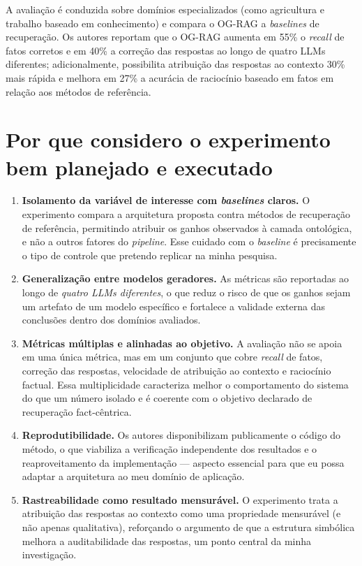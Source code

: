 \documentclass{article}
\begin{document}
	A avaliação é conduzida sobre domínios especializados (como agricultura e
	trabalho baseado em conhecimento) e compara o OG-RAG a \emph{baselines} de
	recuperação. Os autores reportam que o OG-RAG aumenta em 55\% o \textit{recall}
	de fatos corretos e em 40\% a correção das respostas ao longo de quatro LLMs
	diferentes; adicionalmente, possibilita atribuição das respostas ao contexto 30\%
	mais rápida e melhora em 27\% a acurácia de raciocínio baseado em fatos em relação
	aos métodos de referência.
	
	\section{Por que considero o experimento bem planejado e executado}
	
	\begin{enumerate}
		\item \textbf{Isolamento da variável de interesse com \textit{baselines} claros.}
		O experimento compara a arquitetura proposta contra métodos de recuperação de
		referência, permitindo atribuir os ganhos observados à camada ontológica, e não
		a outros fatores do \textit{pipeline}. Esse cuidado com o \textit{baseline} é
		precisamente o tipo de controle que pretendo replicar na minha pesquisa.
		
		\item \textbf{Generalização entre modelos geradores.} As métricas são reportadas
		ao longo de \emph{quatro LLMs diferentes}, o que reduz o risco de que os ganhos
		sejam um artefato de um modelo específico e fortalece a validade externa das
		conclusões dentro dos domínios avaliados.
		
		\item \textbf{Métricas múltiplas e alinhadas ao objetivo.} A avaliação não se
		apoia em uma única métrica, mas em um conjunto que cobre \textit{recall} de
		fatos, correção das respostas, velocidade de atribuição ao contexto e raciocínio
		factual. Essa multiplicidade caracteriza melhor o comportamento do sistema do que
		um número isolado e é coerente com o objetivo declarado de recuperação
		fact-cêntrica.
		
		\item \textbf{Reprodutibilidade.} Os autores disponibilizam publicamente o
		código do método, o que viabiliza a verificação independente dos resultados e o
		reaproveitamento da implementação --- aspecto essencial para que eu possa adaptar
		a arquitetura ao meu domínio de aplicação.
		
		\item \textbf{Rastreabilidade como resultado mensurável.} O experimento trata a
		atribuição das respostas ao contexto como uma propriedade mensurável (e não apenas
		qualitativa), reforçando o argumento de que a estrutura simbólica melhora a
		auditabilidade das respostas, um ponto central da minha investigação.
	\end{enumerate}
	
\end{document}
